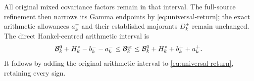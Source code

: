 All original mixed covariance factors remain in that interval.
The full-source refinement then narrows its Gamma endpoints
by \eqref{eq:universal-return}; the exact arithmetic allowances
$a_k^\pm$ and their established majorants $D_k^\pm$ remain
unchanged. The direct Hankel-centred arithmetic interval is
\begin{equation}
 \mathcal B_k^0+H_k^*-b_k^--a_k^-
 \leq\mathcal B_k^{\rm ar}
 \leq\mathcal B_k^0+H_k^*+b_k^++a_k^+.
\end{equation}
It follows by adding the original arithmetic interval to
\eqref{eq:universal-return}, retaining every sign.